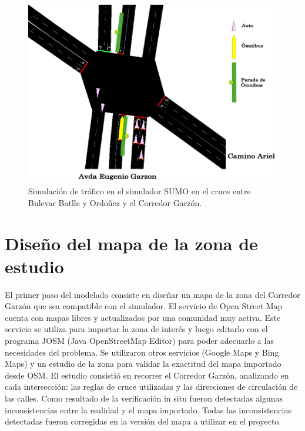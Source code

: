 \begin{figure}[ht]
	\centering
	\includegraphics[width=0.9\linewidth]{Figures/sim1}
	\caption[Simulación de trafico en el simulador SUMO.]{Simulación de tráfico en el simulador SUMO en el cruce entre Bulevar Batlle y Ordoñez y el Corredor Garzón.}
	\label{fig:sim1}
\end{figure}





\section{Diseño del mapa de la zona de estudio}

El primer paso del modelado consiste en diseñar un mapa de la zona del Corredor Garzón que sea compatible con el simulador. El servicio de Open Street Map \citep{OSM} cuenta con mapas libres y actualizados por una comunidad muy activa. Este servicio se utiliza para importar la zona de interés y luego editarlo con el programa JOSM (Java OpenStreetMap Editor) para poder adecuarlo a las necesidades del problema.  Se utilizaron otros servicios (Google Maps y Bing Maps) y un estudio de la zona para validar la exactitud del mapa importado desde OSM. El estudio consistió en recorrer el Corredor Garzón, analizando en cada intersección: las reglas de cruce utilizadas y las direcciones de circulación de las calles. Como resultado de la verificación in situ fueron detectadas algunas inconsistencias entre la realidad y el mapa importado. Todas las inconsistencias detectadas fueron corregidas en la versión del mapa a utilizar en el proyecto. 

